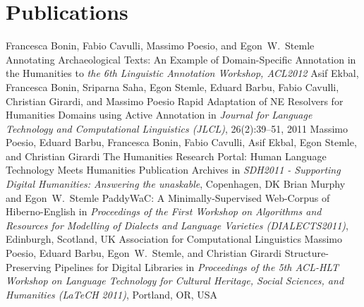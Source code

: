 \documentclass[11pt,a4paper]{moderncv}
\begin{document}
\section{Publications}
        {Francesca Bonin, Fabio Cavulli, Massimo Poesio, and Egon~W.~Stemle}
        {\small Annotating Archaeological Texts: An Example of
        Domain-Specific Annotation in the Humanities}
        {\small to {\em the 6th Linguistic Annotation Workshop, ACL2012}}
        {}
        {}
        {Asif Ekbal, Francesca Bonin, Sriparna Saha, Egon Stemle, Eduard Barbu,
        Fabio Cavulli, Christian Girardi, and Massimo Poesio}
        {\small Rapid Adaptation of NE Resolvers for Humanities Domains using
        Active Annotation}
        {\small in {\em Journal for Language Technology and Computational Linguistics (JLCL)},
        26(2):39--51, 2011}
        {}
        {}
        {Massimo Poesio, Eduard Barbu, Francesca Bonin, Fabio Cavulli, Asif
        Ekbal, Egon Stemle, and Christian Girardi}
        {\small The Humanities Research Portal: Human Language Technology Meets
        Humanities Publication Archives}
        {\small in {\em SDH2011 - Supporting Digital Humanities: Answering the
        unaskable}, Copenhagen, DK}
        {}
        {}
        {Brian Murphy and Egon~W.~Stemle}
        {\small PaddyWaC: A Minimally-Supervised Web-Corpus of Hiberno-English}
        {\small in {\em Proceedings of the First Workshop on Algorithms and
        Resources for Modelling of Dialects and Language Varieties
        (DIALECTS2011)}, Edinburgh, Scotland, UK}
        {\small Association for Computational Linguistics}
        {}
        {Massimo Poesio, Eduard Barbu, Egon~W.~Stemle, and Christian Girardi}
        {Structure-Preserving Pipelines for Digital Libraries}
        {\small in {\em Proceedings of the 5th ACL-HLT Workshop on Language
        Technology for Cultural Heritage, Social Sciences, and Humanities
        (LaTeCH 2011)}, Portland, OR, USA}
\end{document}
